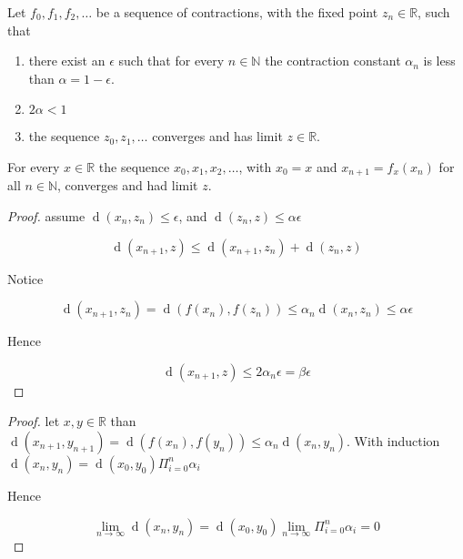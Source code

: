 \begin{theorem}
  Let $f_{0}, f_{1}, f_{2}, \ldots$ be a sequence of contractions, with the
  fixed point $z_{n}\in\mathbb{R}$, such that
  \begin{enumerate}
    \item there exist an $\epsilon$ such that for every $n\in\mathbb{N}$ the
      contraction constant $\alpha_{n}$ is less than $\alpha = 1 - \epsilon$.

    \item $2\alpha < 1$

    \item the sequence $z_{0}, z_{1}, \ldots$ converges and has limit
      $z\in\mathbb{R}$.  
  \end{enumerate}
  

  For every $x\in\mathbb{R}$ the sequence $x_{0}, x_{1}, x_{2}, \ldots$, with
  $x_{0} = x$ and $x_{n+1} = f_{x}(x_{n})$ for all $n\in\mathbb{N}$, converges and
  had limit $z$.
\end{theorem}

\begin{proof}
  assume $\mathop{d}(x_{n}, z_{n}) \le \epsilon$, and $\mathop{d}(z_{n}, z) \le \alpha\epsilon$ 

  \[
  \mathop{d}(x_{n+1}, z) \le \mathop{d}(x_{n+1}, z_{n}) + \mathop{d}(z_{n}, z)
  \]

  Notice

  \[
  \mathop{d}(x_{n+1}, z_{n}) = \mathop{d}(f(x_{n}), f(z_{n})) \le \alpha_{n} \mathop{d}(x_{n}, z_{n}) \le \alpha \epsilon
  \]

  Hence

  \[
  \mathop{d}(x_{n+1}, z) \le 2 \alpha_{n} \epsilon = \beta \epsilon
  \]
\end{proof}

\begin{proof}
  let $x,y \in \mathbb{R}$ than $\mathop{d}(x_{n+1}, y_{n+1}) =
  \mathop{d}(f(x_{n}), f(y_{n})) \le \alpha_{n}\mathop{d}(x_{n}, y_{n})$. With
  induction $\mathop{d}(x_{n}, y_{n}) = \mathop{d}(x_{0}, y_{0})\Pi_{i=0}^{n} \alpha_{i}$

  Hence

  \[
  \lim_{n \rightarrow \infty} \mathop{d}(x_{n}, y_{n}) = \mathop{d}(x_{0}, y_{0})\lim_{n \rightarrow \infty} \Pi_{i=0}^{n} \alpha_{i} = 0
  \]

\end{proof}
